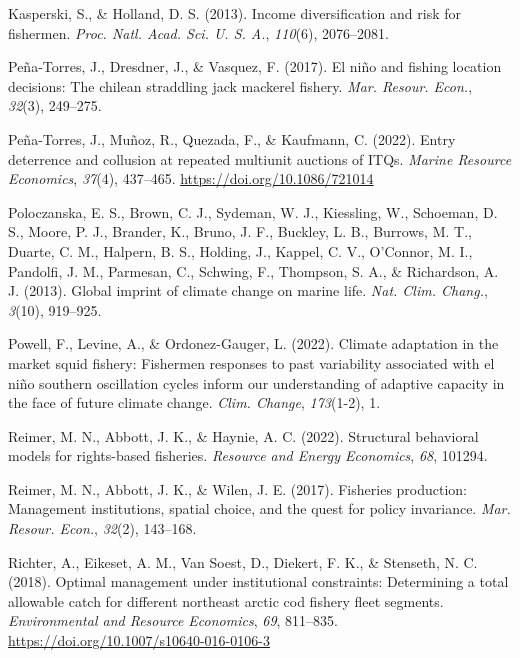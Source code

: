 \documentclass[
  11pt,
]{article}
\newlength{\cslhangindent}
\newenvironment{CSLReferences}[2] %
 {\begin{list}{}{%
  \setlength{\itemindent}{0pt}
  \setlength{\leftmargin}{0pt}
  \setlength{\parsep}{0pt}
  \ifodd #1
   \setlength{\leftmargin}{\cslhangindent}
   \setlength{\itemindent}{-1\cslhangindent}
  \fi
  \setlength{\itemsep}{#2\baselineskip}}}
 {\end{list}}
\begin{document}
\begin{CSLReferences}{1}{0}
Kasperski, S., \& Holland, D. S. (2013). Income diversification and risk for fishermen. \emph{Proc. Natl. Acad. Sci. U. S. A.}, \emph{110}(6), 2076--2081.

Peña-Torres, J., Dresdner, J., \& Vasquez, F. (2017). El niño and fishing location decisions: The chilean straddling jack mackerel fishery. \emph{Mar. Resour. Econ.}, \emph{32}(3), 249--275.

Peña-Torres, J., Muñoz, R., Quezada, F., \& Kaufmann, C. (2022). Entry deterrence and collusion at repeated multiunit auctions of ITQs. \emph{Marine Resource Economics}, \emph{37}(4), 437--465. \url{https://doi.org/10.1086/721014}

Poloczanska, E. S., Brown, C. J., Sydeman, W. J., Kiessling, W., Schoeman, D. S., Moore, P. J., Brander, K., Bruno, J. F., Buckley, L. B., Burrows, M. T., Duarte, C. M., Halpern, B. S., Holding, J., Kappel, C. V., O'Connor, M. I., Pandolfi, J. M., Parmesan, C., Schwing, F., Thompson, S. A., \& Richardson, A. J. (2013). Global imprint of climate change on marine life. \emph{Nat. Clim. Chang.}, \emph{3}(10), 919--925.

Powell, F., Levine, A., \& Ordonez-Gauger, L. (2022). Climate adaptation in the market squid fishery: Fishermen responses to past variability associated with el niño southern oscillation cycles inform our understanding of adaptive capacity in the face of future climate change. \emph{Clim. Change}, \emph{173}(1-2), 1.

Reimer, M. N., Abbott, J. K., \& Haynie, A. C. (2022). Structural behavioral models for rights-based fisheries. \emph{Resource and Energy Economics}, \emph{68}, 101294.

Reimer, M. N., Abbott, J. K., \& Wilen, J. E. (2017). Fisheries production: Management institutions, spatial choice, and the quest for policy invariance. \emph{Mar. Resour. Econ.}, \emph{32}(2), 143--168.

Richter, A., Eikeset, A. M., Van Soest, D., Diekert, F. K., \& Stenseth, N. C. (2018). Optimal management under institutional constraints: Determining a total allowable catch for different northeast arctic cod fishery fleet segments. \emph{Environmental and Resource Economics}, \emph{69}, 811--835. \url{https://doi.org/10.1007/s10640-016-0106-3}


\end{CSLReferences}
\end{document}

